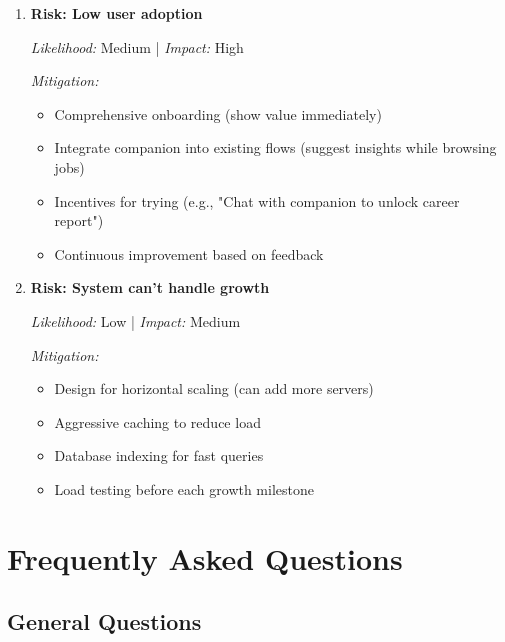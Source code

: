 \documentclass[12pt,a4paper]{article}
\begin{document}
\begin{enumerate}
  \textit{Mitigation:}
  \begin{itemize}
    \item Very transparent about what data we collec
    \item Make data sharing opt-in, not defaul
    \item Easy data export and deletion
    \item Clear privacy policy
    \item User controls over their data
  \end{itemize}

  \item \textbf{Risk: Low user adoption}

  \textit{Likelihood:} Medium | \textit{Impact:} High

  \textit{Mitigation:}
  \begin{itemize}
    \item Comprehensive onboarding (show value immediately)
    \item Integrate companion into existing flows (suggest insights while browsing jobs)
    \item Incentives for trying (e.g., "Chat with companion to unlock career report")
    \item Continuous improvement based on feedback
  \end{itemize}

  \item \textbf{Risk: System can't handle growth}

  \textit{Likelihood:} Low | \textit{Impact:} Medium

  \textit{Mitigation:}
  \begin{itemize}
    \item Design for horizontal scaling (can add more servers)
    \item Aggressive caching to reduce load
    \item Database indexing for fast queries
    \item Load testing before each growth milestone
  \end{itemize}
\end{enumerate}

\section{Frequently Asked Questions}

\subsection{General Questions}
\end{document}
